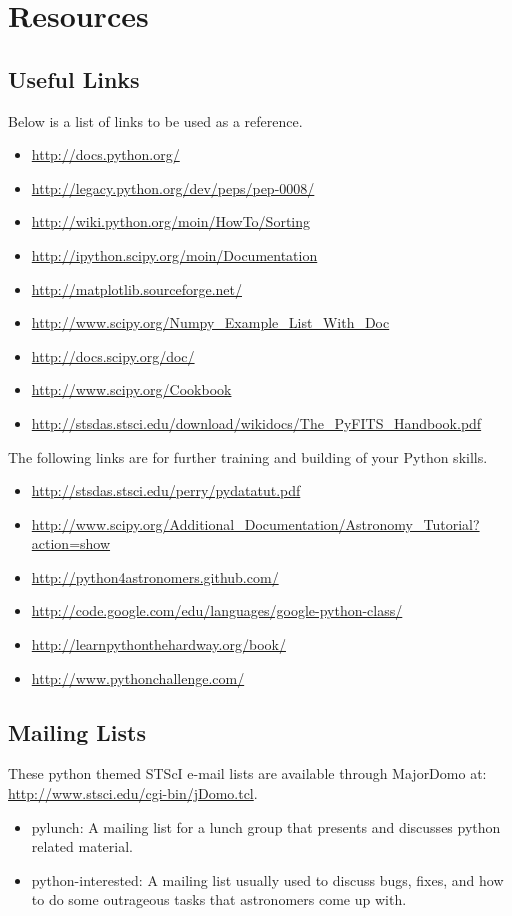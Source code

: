 \chapter{Resources}
\label{ch:links}
 
\section{Useful Links }
Below is a list of links to be used as a reference.
\begin{itemize}
\item \url{http://docs.python.org/}
\item \url{http://legacy.python.org/dev/peps/pep-0008/}
\item \url{http://wiki.python.org/moin/HowTo/Sorting}
\item \url{http://ipython.scipy.org/moin/Documentation}
\item \url{http://matplotlib.sourceforge.net/}
\item \url{http://www.scipy.org/Numpy\_Example\_List\_With\_Doc}
\item \url{http://docs.scipy.org/doc/}
\item \url{http://www.scipy.org/Cookbook}
\item \url{http://stsdas.stsci.edu/download/wikidocs/The\_PyFITS\_Handbook.pdf}
\end{itemize}

The following links are for further training and building of your
Python skills.
\begin{itemize}
\item \url{http://stsdas.stsci.edu/perry/pydatatut.pdf}
\item \url{http://www.scipy.org/Additional_Documentation/Astronomy_Tutorial?action=show}
\item \url{http://python4astronomers.github.com/} 
\item \url{http://code.google.com/edu/languages/google-python-class/}
\item \url{http://learnpythonthehardway.org/book/}
\item \url{http://www.pythonchallenge.com/}
\end{itemize}

\section{Mailing Lists}
These python themed STScI e-mail lists are available through MajorDomo
at: \\
\url{http://www.stsci.edu/cgi-bin/jDomo.tcl}.  
\begin{itemize}
\item pylunch: A mailing list for a lunch group that presents and
  discusses python related material.
\item python-interested: A mailing list usually used to discuss bugs,
  fixes, and how to do some outrageous tasks that astronomers come up
  with.
\end{itemize}